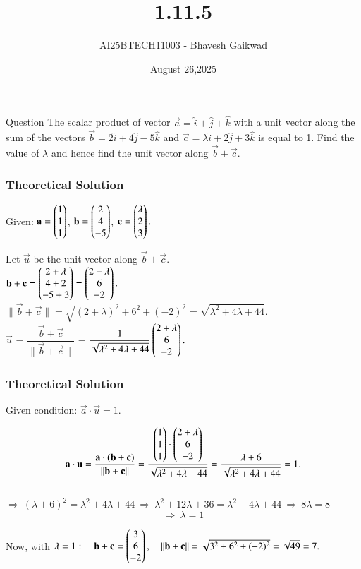\documentclass{beamer}
\title
{1.11.5}
\date{August 26,2025}
\author 
{AI25BTECH11003 - Bhavesh Gaikwad}
\begin{document}
\frame{\titlepage}
\begin{frame}{Question}
The scalar product of vector $\overrightarrow{a} = \hat{i} + \hat{j} + \hat{k}$ with a unit vector along the sum of the vectors $\overrightarrow{b} =2\hat{i} + 4\hat{j} - 5\hat{k} $ and $\overrightarrow{c} = \lambda\hat{i} + 2\hat{j} + 3\hat{k}$ is equal to 1. Find the value of $\lambda$ and hence find the unit vector along $\overrightarrow{b} + \overrightarrow{c}$.
\end{frame}


\begin{frame}[fragile]
    \frametitle{Theoretical Solution}
 Given: $\mathbf{a}=\begin{pmatrix}1\\1\\1\end{pmatrix}$,  $\mathbf{b}=\begin{pmatrix}2\\4\\-5\end{pmatrix}$,  $\mathbf{c}=\begin{pmatrix}\lambda\\2\\3\end{pmatrix}.$

Let $\vec{u}$ be the unit vector along $\vec{b} + \vec{c} .$ \\

$ \mathbf{b} + \mathbf{c} = \begin{pmatrix}2+\lambda\\4+2\\-5+3\end{pmatrix}
=\begin{pmatrix}2+\lambda\\6\\-2\end{pmatrix}.$ \\

$\|\vec{b}+\vec{c}\| = \sqrt{(2+\lambda)^2+6^2+(-2)^2}
 = \sqrt{\lambda^2+4\lambda+44}.$ \\

$\vec{u}$ = $\dfrac{\vec{b} + \vec{c}}{\|\vec{b}+\vec{c}\|}$ = $\dfrac{1}{\sqrt{\lambda^2+4\lambda+44}} \begin{pmatrix}2+\lambda\\6\\-2\end{pmatrix}.$ 

\end{frame}


\begin{frame}[fragile]
    \frametitle{Theoretical Solution}
    Given condition: $\vec{a}\cdot \vec{u}=1.$  

$$ \mathbf{a}\cdot\mathbf{u} = \dfrac{\mathbf{a}\cdot(\mathbf{b}+\mathbf{c})}{\|\mathbf{b}+\mathbf{c}\|}
= \dfrac{\begin{pmatrix}1\\1\\1\end{pmatrix}\cdot\begin{pmatrix}2+\lambda\\6\\-2\end{pmatrix}}
{\sqrt{\lambda^2+4\lambda+44}}
= \dfrac{\lambda+6}{\sqrt{\lambda^2+4\lambda+44}}=1.
$$ \\


$
\Rightarrow\ (\lambda+6)^2=\lambda^2+4\lambda+44
\ \Longrightarrow\ 
\lambda^2+12\lambda+36=\lambda^2+4\lambda+44
\ \Longrightarrow\ 
8\lambda=8\ $
$$\Longrightarrow\ 
\boxed{\lambda=1}$$

Now, with $\lambda=1:\quad \mathbf{b}+\mathbf{c}
=\begin{pmatrix}3\\6\\-2\end{pmatrix},\quad \|\mathbf{b}+\mathbf{c}\|
=\sqrt{3^2+6^2+(-2)^2} = \sqrt{49} = 7.$ \\
\end{frame}
\end{document}
